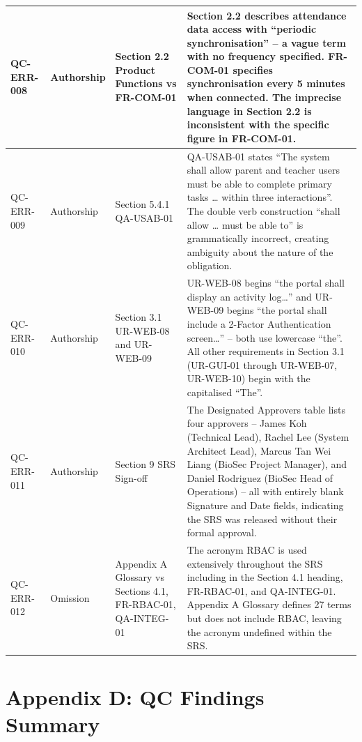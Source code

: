 \documentclass[11pt,a4paper]{article}
\begin{document}
\begin{longtable}{|>{\RaggedRight\arraybackslash}p{}|>{\RaggedRight\arraybackslash}p{}|>{\RaggedRight\arraybackslash}p{}|>{\RaggedRight\arraybackslash}p{}|}
\hline
QC-ERR-008 & Authorship & Section 2.2 Product Functions vs FR-COM-01 & Section 2.2 describes attendance data access with ``periodic synchronisation'' -- a vague term with no frequency specified. FR-COM-01 specifies synchronisation every 5 minutes when connected. The imprecise language in Section 2.2 is inconsistent with the specific figure in FR-COM-01. \\
\hline
QC-ERR-009 & Authorship & Section 5.4.1 QA-USAB-01 & QA-USAB-01 states ``The system shall allow parent and teacher users must be able to complete primary tasks \ldots{} within three interactions''. The double verb construction ``shall allow \ldots{} must be able to'' is grammatically incorrect, creating ambiguity about the nature of the obligation. \\
\hline
QC-ERR-010 & Authorship & Section 3.1 UR-WEB-08 and UR-WEB-09 & UR-WEB-08 begins ``the portal shall display an activity log\ldots{}'' and UR-WEB-09 begins ``the portal shall include a 2-Factor Authentication screen\ldots{}'' -- both use lowercase ``the''. All other requirements in Section 3.1 (UR-GUI-01 through UR-WEB-07, UR-WEB-10) begin with the capitalised ``The''. \\
\hline
QC-ERR-011 & Authorship & Section 9 SRS Sign-off & The Designated Approvers table lists four approvers -- James Koh (Technical Lead), Rachel Lee (System Architect Lead), Marcus Tan Wei Liang (BioSec Project Manager), and Daniel Rodriguez (BioSec Head of Operations) -- all with entirely blank Signature and Date fields, indicating the SRS was released without their formal approval. \\
\hline
QC-ERR-012 & Omission & Appendix A Glossary vs Sections 4.1, FR-RBAC-01, QA-INTEG-01 & The acronym RBAC is used extensively throughout the SRS including in the Section 4.1 heading, FR-RBAC-01, and QA-INTEG-01. Appendix A Glossary defines 27 terms but does not include RBAC, leaving the acronym undefined within the SRS. \\
\hline
\end{longtable}
\label{tab:qc-error-detection}
\endgroup

\clearpage
{}
\setcounter{page}{1}
\renewcommand{\thepage}{D-\arabic{page}}
\section*{Appendix D: QC Findings Summary}
{}
\end{document}
